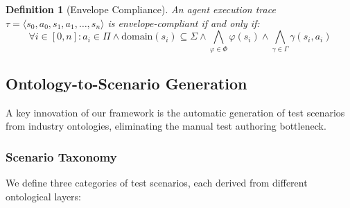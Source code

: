 \documentclass[11pt,a4paper]{article}
\newtheorem{definition}{Definition}[section]
\newcommand{\prop}{\varphi}
\begin{document}
\begin{definition}[Envelope Compliance]
  An agent execution trace $\tau = \langle s_0, a_0, s_1, a_1,
  \ldots, s_n \rangle$ is \emph{envelope-compliant} if and only if:
  \begin{equation}
    \forall i \in [0, n]: a_i \in \Pi \wedge
      \text{domain}(s_i) \subseteq \Sigma \wedge
      \bigwedge_{\prop \in \Phi} \prop(s_i) \wedge
      \bigwedge_{\gamma \in \Gamma} \gamma(s_i, a_i)
  \end{equation}
\end{definition}

\subsection{Ontology-to-Scenario Generation}
\label{sec:scenario-generation}

A key innovation of our framework is the automatic generation of test
scenarios from industry ontologies, eliminating the manual test
authoring bottleneck.

\subsubsection{Scenario Taxonomy}

We define three categories of test scenarios, each derived from
different ontological layers:
\end{document}
